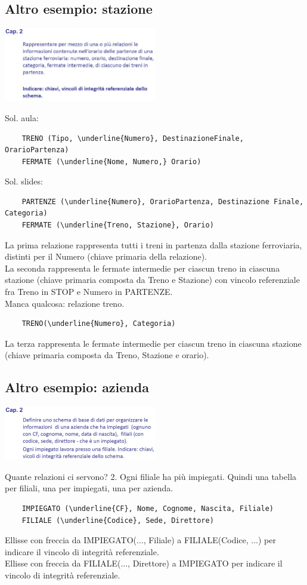 \subsection{Altro esempio: stazione}
\begin{center}
    \includegraphics[width=0.5\textwidth]{chaptersLezioniSara/img/MR_es_stazione1.jpg}
\end{center}
Sol. aula:
\begin{verbatim}
    TRENO (Tipo, \underline{Numero}, DestinazioneFinale, OrarioPartenza)
    FERMATE (\underline{Nome, Numero,} Orario)
\end{verbatim}
Sol. slides:
\begin{verbatim}
    PARTENZE (\underline{Numero}, OrarioPartenza, Destinazione Finale, Categoria)
    FERMATE (\underline{Treno, Stazione}, Orario)
\end{verbatim}
La prima relazione rappresenta tutti i treni in partenza dalla stazione ferroviaria, distinti per il Numero (chiave primaria della relazione).
\\La seconda rappresenta le fermate intermedie per ciascun treno in ciascuna stazione (chiave primaria composta da Treno e Stazione) con vincolo referenziale fra Treno in STOP e Numero in PARTENZE.
\\Manca qualcosa: relazione treno.
\begin{verbatim}
    TRENO(\underline{Numero}, Categoria)
\end{verbatim}
La terza rappresenta le fermate intermedie per ciascun treno in ciascuna stazione (chiave primaria composta da Treno, Stazione e orario).

\subsection{Altro esempio: azienda}
\begin{center}
    \includegraphics[width=0.5\textwidth]{chaptersLezioniSara/img/MR_es_azienda1.jpg}
\end{center}
Quante relazioni ci servono? 2. Ogni filiale ha più impiegati. Quindi una tabella per filiali, una per impiegati, una per azienda.
\begin{verbatim}
    IMPIEGATO (\underline{CF}, Nome, Cognome, Nascita, Filiale)
    FILIALE (\underline{Codice}, Sede, Direttore)
\end{verbatim}
Ellisse con freccia da IMPIEGATO(..., Filiale) a FILIALE(Codice, ...) per indicare il vincolo di integrità referenziale.
\\Ellisse con freccia da FILIALE(..., Direttore) a IMPIEGATO per indicare il vincolo di integrità referenziale.

